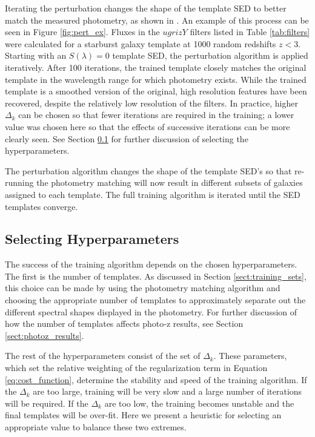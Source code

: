 Iterating the perturbation changes the shape of the template SED to better match the measured photometry, as shown in \citet{Budavari2000b}. 
An example of this process can be seen in Figure \ref{fig:pert_ex}. 
Fluxes in the $ugrizY$ filters listed in Table \ref{tab:filters} were calculated for a starburst galaxy template at 1000 random redshifts $z < 3$. 
Starting with an $S(\lambda) = 0$ template SED, the perturbation algorithm is applied iteratively. 
After 100 iterations, the trained template closely matches the original template in the wavelength range for which photometry exists. 
While the trained template is a smoothed version of the original, high resolution features have been recovered, despite the relatively low resolution of the filters. 
In practice, higher $\Delta_k$ can be chosen so that fewer iterations are required in the training; a lower value was chosen here so that the effects of successive iterations can be more clearly seen.
See Section \ref{sect:hyperparameters} for further discussion of selecting the hyperparameters.

The perturbation algorithm changes the shape of the template SED's so that re-running the photometry matching will now result in different subsets of galaxies assigned to each template.
The full training algorithm is iterated until the SED templates converge.




\subsection{Selecting Hyperparameters}
\label{sect:hyperparameters}

The success of the training algorithm depends on the chosen hyperparameters.
The first is the number of templates. 
As discussed in Section \ref{sect:training_sets}, this choice can be made by using the photometry matching algorithm and choosing the appropriate number of templates to approximately separate out the different spectral shapes displayed in the photometry.
For further discussion of how the number of templates affects photo-z results, see Section \ref{sect:photoz_results}.

The rest of the hyperparameters consist of the set of $\Delta_k$.
These parameters, which set the relative weighting of the regularization term in Equation \ref{eq:cost_function}, determine the stability and speed of the training algorithm.
If the $\Delta_k$ are too large, training will be very slow and a large number of iterations will be required. 
If the $\Delta_k$ are too low, the training becomes unstable and the final templates will be over-fit.
Here we present a heuristic for selecting an appropriate value to balance these two extremes.

